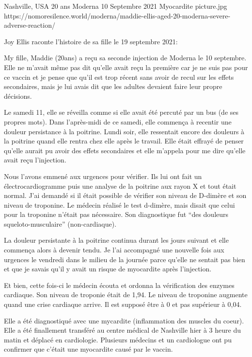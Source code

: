 {Nashville, USA}
{20 ans}
{Moderna}
{10 Septembre 2021}
{Myocardite}
{picture.jpg}
{https://nomoresilence.world/moderna/maddie-ellis-aged-20-moderna-severe-adverse-reaction/}
{

Joy Ellis raconte l'histoire de sa fille le 19 septembre 2021:

My fille, Maddie (20ans) a reçu sa seconde injection de Moderna le 10 septembre. Elle ne m'avait même pas dit qu'elle avait reçu la première car je ne suis pas pour ce vaccin et je pense que qu'il est trop récent sans avoir de recul sur les effets secondaires, mais je lui avais dit que les adultes devaient faire leur propre décisions.

Le samedi 11, elle se réveilla comme si elle avait été percuté par un bus (de ses propres mots). Dans l'après-midi de ce samedi, elle commença à recentir une douleur persistance à la poitrine. Lundi soir, elle ressentait encore des douleurs à la poitrine quand elle rentra chez elle après le travail. Elle était effrayé de penser qu'elle aurait pu avoir des effets secondaires et elle m'appela pour me dire qu'elle avait reçu l'injection.

Nous l'avons emmené aux urgences pour vérifier. Ils lui ont fait un électrocardiogramme puis une analyse de la poitrine aux rayon X et tout était normal. J'ai demandé si il était possible de vérifier son niveau de D-dimère et son niveau de troponine. Le médecin réalisé le test d-dimère, mais disait que celui pour la troponine n'était pas nécessaire. Son diagnostique fut “des douleurs squeloto-musculaire” (non-cardiaque).

La douleur persistante à la poitrine continua durant les jours suivant et elle commença alors à devenir tendu. Je l'ai accompagné une nouvelle fois aux urgences le vendredi dans le milieu de la journée parce qu'elle ne sentait pas bien et que je savais qu'il y avait un risque de myocardite après l'injection.

Et bien, cette fois-ci le médecin écouta et ordonna la vérification des enzymes cardiaque. Son niveau de troponie était de 1,94. Le niveau de troponine augmente quand une crise cardiaque arrive. Il est supposé être à 0 et pas supérieur à 0,04.

Elle a été diagnostiqué avec une mycardite (inflammation des muscles du coeur). Elle a été finallement transféré au centre médical de Nashville hier à 3 heure du matin et déplacé en cardiologie. Plusieurs médecins et un cardiologue ont pu confirmer que c'était une myocardite causé par le vaccin.

}
